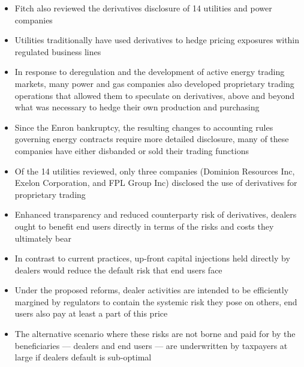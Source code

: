 \documentclass[11pt]{beamer}
\begin{document}
\begin{frame}
\begin{itemize}
\item Fitch also reviewed the derivatives disclosure of 14 utilities and power companies
\item Utilities traditionally have used derivatives to hedge pricing exposures within regulated business lines
\item In response to deregulation and the development of active energy trading markets, many power and gas companies also developed proprietary trading operations that allowed them to speculate on derivatives, above and beyond what was necessary to hedge
their own production and purchasing
\item Since the Enron bankruptcy, the resulting changes to accounting rules governing energy contracts require more detailed disclosure, many
of these companies have either disbanded or sold their trading functions
\item Of the 14 utilities reviewed, only three companies (Dominion Resources Inc, Exelon Corporation, and FPL Group Inc) disclosed the use of derivatives for proprietary trading
\end{itemize}
\end{frame}

\begin{frame}
\begin{itemize}
\item Enhanced transparency and reduced counterparty risk of derivatives, dealers ought to benefit end users directly in terms of the risks and costs they ultimately bear
\item In contrast to current practices, up-front capital injections held directly by dealers would reduce the default risk that end users face
\item Under the proposed reforms, dealer activities are intended to be efficiently margined by regulators to contain the systemic risk they pose on others, end users also pay at least a part of this price
\item The alternative scenario where these risks are not borne and paid for by the beneficiaries — dealers and end users — are underwritten by taxpayers at large if dealers default is sub-optimal
\end{itemize}
\end{frame}
\end{document}

